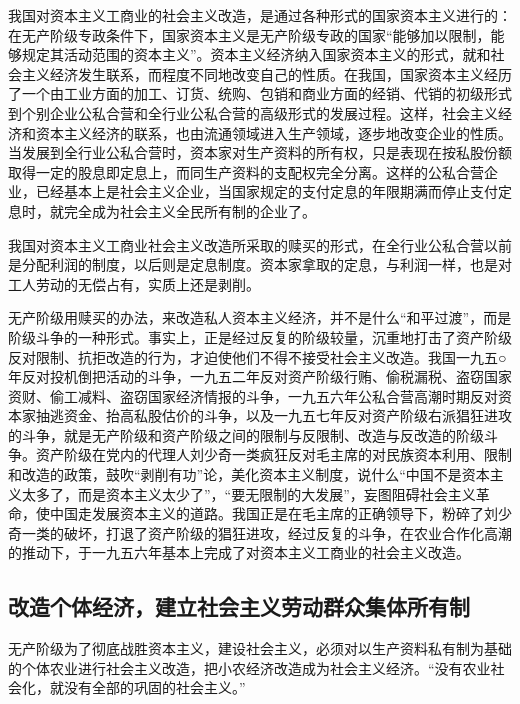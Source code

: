 \documentclass{book}
\begin{document}
我国对资本主义工商业的社会主义改造，是通过各种形式的国家资本主义进行的：在无产阶级专政条件下，国家资本主义是无产阶级专政的国家“能够加以限制，能够规定其活动范围的资本主义”。资本主义经济纳入国家资本主义的形式，就和社会主义经济发生联系，而程度不同地改变自己的性质。在我国，国家资本主义经历了一个由工业方面的加工、订货、统购、包销和商业方面的经销、代销的初级形式到个别企业公私合营和全行业公私合营的高级形式的发展过程。这样，社会主义经济和资本主义经济的联系，也由流通领域进入生产领域，逐步地改变企业的性质。当发展到全行业公私合营时，资本家对生产资料的所有权，只是表现在按私股份额取得一定的股息即定息上，而同生产资料的支配权完全分离。这样的公私合营企业，已经基本上是社会主义企业，当国家规定的支付定息的年限期满而停止支付定息时，就完全成为社会主义全民所有制的企业了。

我国对资本主义工商业社会主义改造所采取的赎买的形式，在全行业公私合营以前是分配利润的制度，以后则是定息制度。资本家拿取的定息，与利润一样，也是对工人劳动的无偿占有，实质上还是剥削。

无产阶级用赎买的办法，来改造私人资本主义经济，并不是什么“和平过渡”，而是阶级斗争的一种形式。事实上，正是经过反复的阶级较量，沉重地打击了资产阶级反对限制、抗拒改造的行为，才迫使他们不得不接受社会主义改造。我国一九五○年反对投机倒把活动的斗争，一九五二年反对资产阶级行贿、偷税漏税、盗窃国家资财、偷工减料、盗窃国家经济情报的斗争，一九五六年公私合营高潮时期反对资本家抽逃资金、抬高私股估价的斗争，以及一九五七年反对资产阶级右派猖狂进攻的斗争，就是无产阶级和资产阶级之间的限制与反限制、改造与反改造的阶级斗争。资产阶级在党内的代理人刘少奇一类疯狂反对毛主席的对民族资本利用、限制和改造的政策，鼓吹“剥削有功”论，美化资本主义制度，说什么“中国不是资本主义太多了，而是资本主义太少了”，“要无限制的大发展”，妄图阻碍社会主义革命，使中国走发展资本主义的道路。我国正是在毛主席的正确领导下，粉碎了刘少奇一类的破坏，打退了资产阶级的猖狂进攻，经过反复的斗争，在农业合作化高潮的推动下，于一九五六年基本上完成了对资本主义工商业的社会主义改造。

\subsection{改造个体经济，建立社会主义劳动群众集体所有制}

无产阶级为了彻底战胜资本主义，建设社会主义，必须对以生产资料私有制为基础的个体农业进行社会主义改造，把小农经济改造成为社会主义经济。“没有农业社会化，就没有全部的巩固的社会主义。”
\end{document}
